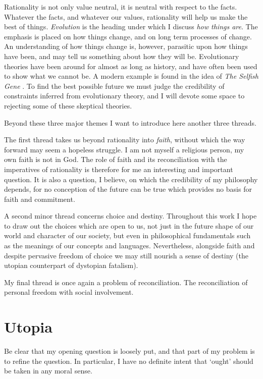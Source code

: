 Rationality is not only value neutral, it is neutral with respect to the facts.
Whatever the facts, and whatever our values, rationality will help us make the best of things.
{\it Evolution} is the heading under which I discuss {\it how things are}.
The emphasis is placed on how things change, and on long term processes of change.
An understanding of how things change is, however, parasitic upon how things have been, and may tell us something about how they will be.
Evolutionary theories have been around for almost as long as history, and have often been used to show what we cannot be.
A modern example is found in the idea of {\it The Selfish Gene} \cite{dawkinsSG}.
To find the best possible future we must judge the credibility of constraints inferred from evolutionary theory, and I will devote some space to rejecting some of these skeptical theories.

Beyond these three major themes I want to introduce here another three threads.

The first thread takes us beyond rationality into {\it faith}, without which the way forward may seem a hopeless struggle.
I am not myself a religious person, my own faith is not in God.
The role of faith and its reconciliation with the imperatives of rationality is therefore for me an interesting and important question.
It is also a question, I believe, on which the credibility of my philosophy depends, for no conception of the future can be true which provides no basis for faith and commitment.

A second minor thread concerns choice and destiny.
Throughout this work I hope to draw out the choices which are open to us, not just in the future shape of our world and character of our society, but even in philosophical fundamentals such as the meanings of our concepts and languages.
Nevertheless, alongside faith and despite pervasive freedom of choice we may still nourish a sense of destiny (the utopian counterpart of dystopian fatalism).

My final thread is once again a problem of reconciliation.
The reconciliation of personal freedom with social involvement.

\section{Utopia}

Be clear that my opening question is loosely put, and that part of my problem is to refine the question. 
In particular, I have no definite intent that `ought' should be taken in any moral sense.

